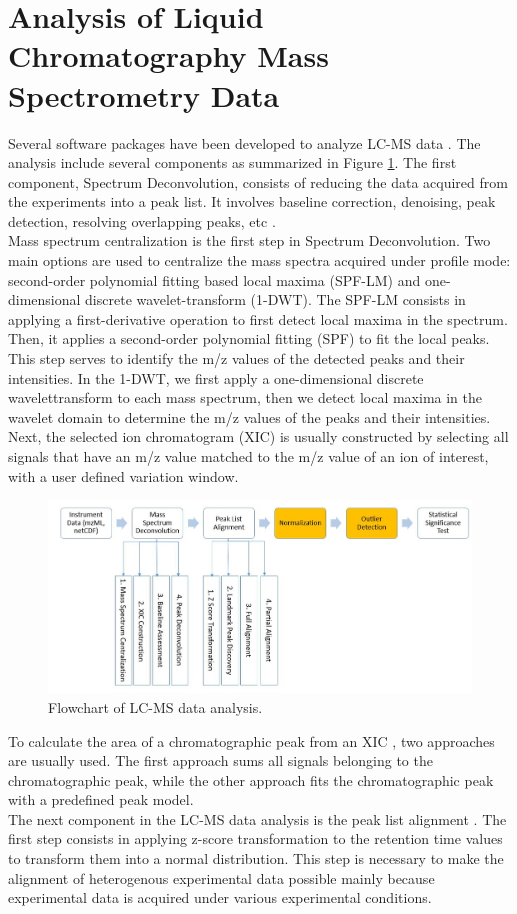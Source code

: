 \section{Analysis of Liquid Chromatography Mass Spectrometry Data}
Several software packages have been developed to analyze LC-MS data \cite{lcms2}. The analysis include several components as summarized in Figure \ref{flo}. The first component, Spectrum Deconvolution, consists of reducing the data acquired from the experiments into a peak list. It involves baseline correction, denoising, peak detection, resolving overlapping peaks, etc \cite{specdeco}.\\
\indent Mass spectrum centralization is the first step in Spectrum Deconvolution. Two main options are used to centralize the mass spectra acquired under profile mode: second-order polynomial fitting based
local maxima (SPF-LM) and one-dimensional discrete
wavelet-transform (1-DWT). The SPF-LM consists in applying a first-derivative operation to first detect local maxima in the spectrum. Then, it applies a second-order polynomial fitting (SPF) to fit the local peaks. This step serves to identify the m/z values of the detected peaks and their intensities. In the 1-DWT, we first apply a one-dimensional discrete wavelettransform to each mass spectrum, then we detect local maxima in the wavelet domain to determine the m/z values of the peaks and their intensities.\\

Next, the selected ion chromatogram
(XIC) is usually constructed by selecting all signals that have an
m/z value matched to the m/z value of an ion of interest, with a
user defined variation window.
\begin{figure}
	\centering
	\includegraphics[width=16cm]{flow_data_process.JPG}
	\caption{Flowchart of LC-MS data analysis.}
	\label{flo}
\end{figure}

To calculate the area of a chromatographic peak from an XIC \cite{xic}, two approaches are usually used. The first approach sums all signals belonging to the chromatographic peak, while the other approach fits the chromatographic peak with a predefined peak model.\\
\indent The next component in the LC-MS data analysis is the peak list alignment \cite{lcms2}. The first step consists in applying z-score transformation to the retention time values to transform them into a normal distribution. This step is necessary to make the alignment of heterogenous experimental data possible mainly because experimental data is acquired under various experimental conditions.

